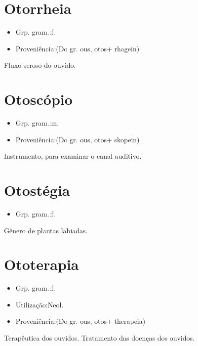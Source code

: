 \section{Otorrheia}
\begin{itemize}
\item {Grp. gram.:f.}
\end{itemize}
\begin{itemize}
\item {Proveniência:(Do gr. \textunderscore ous\textunderscore , \textunderscore otos\textunderscore  + \textunderscore rhagein\textunderscore )}
\end{itemize}
Fluxo seroso do ouvido.
\section{Otoscópio}
\begin{itemize}
\item {Grp. gram.:m.}
\end{itemize}
\begin{itemize}
\item {Proveniência:(Do gr. \textunderscore ous\textunderscore , \textunderscore otos\textunderscore  + \textunderscore skopein\textunderscore )}
\end{itemize}
Instrumento, para examinar o canal auditivo.
\section{Otostégia}
\begin{itemize}
\item {Grp. gram.:f.}
\end{itemize}
Gênero de plantas labiadas.
\section{Ototerapia}
\begin{itemize}
\item {Grp. gram.:f.}
\end{itemize}
\begin{itemize}
\item {Utilização:Neol.}
\end{itemize}
\begin{itemize}
\item {Proveniência:(Do gr. \textunderscore ous\textunderscore , \textunderscore otos\textunderscore  + \textunderscore therapeia\textunderscore )}
\end{itemize}
Terapêutica dos ouvidos.
Tratamento das doenças dos ouvidos.
